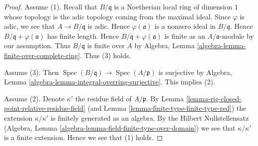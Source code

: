 \documentclass[10pt,a4paper]{amsart}
\theoremstyle{plain}
\theoremstyle{definition}
\theoremstyle{remark}
\numberwithin{equation}{subsection}
\def\Spec{\mathop{\mathrm{Spec}}}
\begin{document}
\begin{proof}
Assume (1). Recall that $B/\mathfrak q$ is a Noetherian local ring
of dimension $1$ whose topology is the adic topology coming
from the maximal ideal. Since $\varphi$ is adic, we see that
$A \to B/\mathfrak q$ is adic. Hence $\varphi(\mathfrak a)$
is a nonzero ideal in $B/\mathfrak q$. Hence
$B/\mathfrak q + \varphi(\mathfrak a)$
has finite length. Hence $B/\mathfrak q + \varphi(\mathfrak a)$
is finite as an $A/\mathfrak a$-module by our assumption.
Thus $B/\mathfrak q$ is finite over $A$ by
Algebra, Lemma \ref{algebra-lemma-finite-over-complete-ring}.
Thus (3) holds.

\medskip\noindent
Assume (3). Then $\Spec(B/\mathfrak q) \to \Spec(A/\mathfrak p)$
is surjective by
Algebra, Lemma \ref{algebra-lemma-integral-overring-surjective}.
This implies (2).

\medskip\noindent
Assume (2). Denote $\kappa'$ the residue field of $A/\mathfrak p$.
By Lemma \ref{lemma-rig-closed-point-relative-residue-field}
(and Lemma \ref{lemma-finite-type-finite-type-red})
the extension $\kappa/\kappa'$ is finitely generated as an algebra.
By the Hilbert Nullstellensatz (Algebra, Lemma
\ref{algebra-lemma-field-finite-type-over-domain})
we see that $\kappa/\kappa'$ is a finite extension.
Hence we see that (1) holds.
\end{proof}
\end{document}
